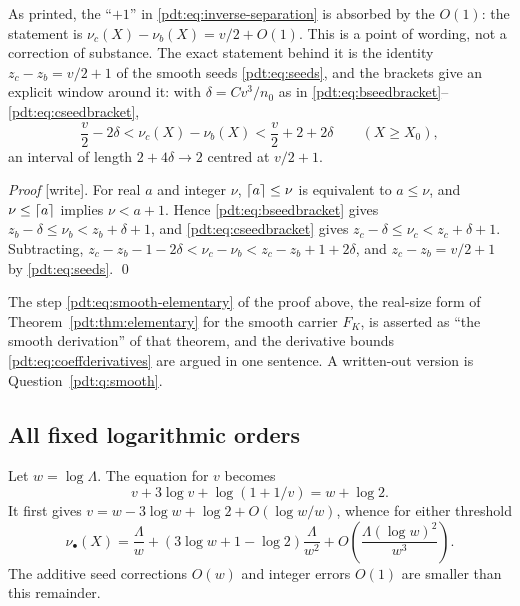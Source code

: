 \begin{writenote}
As printed, the ``$+1$'' in \eqref{pdt:eq:inverse-separation} is absorbed
by the $O(1)$: the statement is $\nu_c(X)-\nu_b(X)=v/2+O(1)$. This is a
point of wording, not a correction of substance. The exact statement behind
it is the identity $z_c-z_b=v/2+1$ of the smooth seeds \eqref{pdt:eq:seeds},
and the brackets give an explicit window around it: with
$\delta=Cv^3/n_0$ as in \eqref{pdt:eq:bseedbracket}--\eqref{pdt:eq:cseedbracket},
\[
 \frac v2-2\delta<\nu_c(X)-\nu_b(X)<\frac v2+2+2\delta\qquad(X\ge X_0),
\]
an interval of length $2+4\delta\to2$ centred at $v/2+1$.

\emph{Proof} [write]. For real $a$ and integer $\nu$, $\left\lceil a\right\rceil\le\nu$ is
equivalent to $a\le\nu$, and $\nu\le\left\lceil a\right\rceil$ implies $\nu<a+1$. Hence
\eqref{pdt:eq:bseedbracket} gives $z_b-\delta\le\nu_b<z_b+\delta+1$, and
\eqref{pdt:eq:cseedbracket} gives $z_c-\delta\le\nu_c<z_c+\delta+1$.
Subtracting, $z_c-z_b-1-2\delta<\nu_c-\nu_b<z_c-z_b+1+2\delta$, and
$z_c-z_b=v/2+1$ by \eqref{pdt:eq:seeds}. \qed

The step \eqref{pdt:eq:smooth-elementary} of the proof above, the
real-size form of Theorem~\ref{pdt:thm:elementary} for the smooth carrier
$F_K$, is asserted as ``the smooth derivation'' of that theorem, and the
derivative bounds \eqref{pdt:eq:coeffderivatives} are argued in one
sentence. A written-out version is Question~\ref{pdt:q:smooth}.
\end{writenote}

\subsection{All fixed logarithmic orders}
Let $w=\log\Lambda$. The equation for $v$ becomes
\begin{equation}\label{pdt:eq:vlogs}
 v+3\log v+\log(1+1/v)=w+\log2.
\end{equation}
It first gives $v=w-3\log w+\log2+O(\log w/w)$, whence for either threshold
\begin{equation}\label{pdt:eq:twoinverseorders}
 \nu_\bullet(X)=\frac{\Lambda}{w}
       +(3\log w+1-\log2)\frac{\Lambda}{w^2}
       +O\!\left(\frac{\Lambda(\log w)^2}{w^3}\right).
\end{equation}
The additive seed corrections $O(w)$ and integer errors $O(1)$ are smaller than this remainder.


